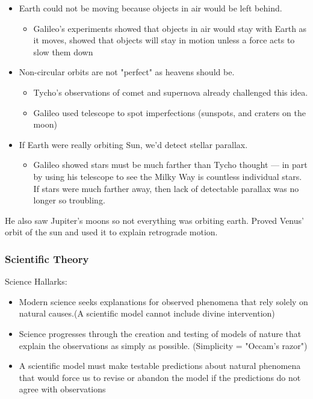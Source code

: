 \documentclass[12pt]{article}
\begin{document}
\begin{itemize}
    \item Earth could not be moving because objects in air would be left behind.
    \begin{itemize}
        \item Galileo's experiments showed that objects in air would stay with Earth as it moves, showed that objects will stay in motion unless a force acts to slow them down
    \end{itemize}
    \item Non-circular orbits are not "perfect" as heavens should be.
    \begin{itemize}
        \item Tycho's observations of comet and supernova already challenged this idea.
        \item Galileo used telescope to spot imperfections (sunspots, and craters on the moon)
    \end{itemize}
    \item If Earth were really orbiting Sun, we'd detect stellar parallax.
    \begin{itemize}
        \item Galileo showed stars must be much farther than Tycho thought — in part by using his telescope to see the Milky Way is countless individual stars. If stars were much farther away, then lack of detectable parallax was no longer so troubling.
    \end{itemize}
\end{itemize}
He also saw Jupiter's moons so not everything was orbiting earth. Proved Venus' orbit of the sun and used it to explain retrograde motion.

\subsubsection{Scientific Theory}
Science Hallarks:
\begin{itemize}
    \item Modern science seeks explanations for observed phenomena that rely solely on natural causes.(A scientific model cannot include divine intervention)
    \item Science progresses through the creation and  testing of models of nature that explain the  observations as simply as possible. (Simplicity = "Occam's razor")
    \item A scientific model must make testable predictions about natural phenomena that would force us to revise or abandon the model if the predictions do not agree with observations
\end{itemize}
\end{document}
